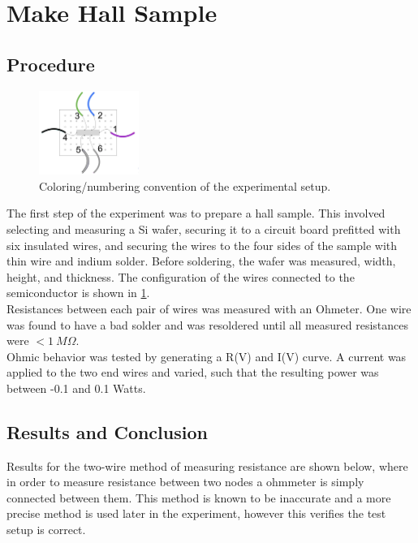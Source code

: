 \documentclass[aps,prl,reprint]{revtex4-2}
\begin{document}
\section{Make Hall Sample}

\subsection{Procedure}

\begin{figure}
	\begin{center}
		\includegraphics[width=0.29\textwidth]{../Images/l2_WireDiagram.jpg}
	\end{center}
	\caption{\label{colors} Coloring/numbering convention of the experimental setup.}
\end{figure}

The first step of the experiment was to prepare a hall sample. This involved selecting
and measuring a Si wafer, securing it to a circuit board prefitted with six insulated wires,
and securing the wires to the four sides of the sample with thin wire and indium solder. 
Before soldering, the wafer was measured, width, height, and thickness. 
The configuration of the wires connected to the semiconductor is shown in \ref{colors}. \\

Resistances between each pair of wires was measured with an Ohmeter. One wire was found to have
a bad solder and was resoldered until all measured resistances were $< 1\ M\Omega$. \\

Ohmic behavior was tested by generating a R(V) and I(V) curve. A current was applied to 
the two end wires and varied, such that the resulting power was between -0.1 and 0.1 Watts. \\

\subsection{Results and Conclusion}

Results for the two-wire method of measuring resistance are shown below, where in order to 
measure resistance between two nodes a ohmmeter is simply connected between them. This method
is known to be inaccurate and a more precise method is used later in the experiment, however
this verifies the test setup is correct.
\end{document}
